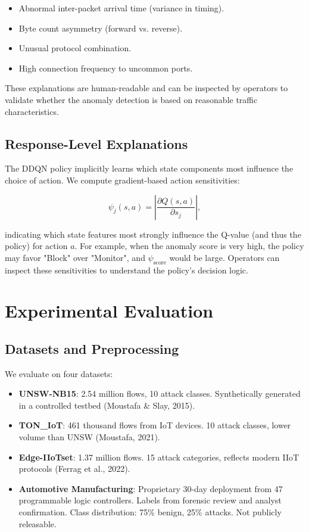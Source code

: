 \documentclass[preprint,12pt]{elsarticle}
\begin{document}
\begin{itemize}[leftmargin=1.2em]
    \item Abnormal inter-packet arrival time (variance in timing).
    \item Byte count asymmetry (forward vs. reverse).
    \item Unusual protocol combination.
    \item High connection frequency to uncommon ports.
\end{itemize}

These explanations are human-readable and can be inspected by operators to validate whether the anomaly detection is based on reasonable traffic characteristics.

\subsection{Response-Level Explanations}

The DDQN policy implicitly learns which state components most influence the choice of action. We compute gradient-based action sensitivities:

\begin{equation}
\psi_j(s, a) = \left| \frac{\partial Q(s, a)}{\partial s_j} \right|,
\label{eq:q_sensitivity}
\end{equation}

indicating which state features most strongly influence the Q-value (and thus the policy) for action $a$. For example, when the anomaly score is very high, the policy may favor "Block" over "Monitor", and $\psi_{\text{score}}$ would be large. Operators can inspect these sensitivities to understand the policy's decision logic.

\section{Experimental Evaluation}
\label{sec:experiments}

\subsection{Datasets and Preprocessing}

We evaluate on four datasets:

\begin{itemize}[leftmargin=1.2em]
    \item \textbf{UNSW-NB15}: 2.54 million flows, 10 attack classes. Synthetically generated in a controlled testbed (Moustafa \& Slay, 2015).
    \item \textbf{TON\_IoT}: 461 thousand flows from IoT devices. 10 attack classes, lower volume than UNSW (Moustafa, 2021).
    \item \textbf{Edge-IIoTset}: 1.37 million flows. 15 attack categories, reflects modern IIoT protocols (Ferrag et al., 2022).
    \item \textbf{Automotive Manufacturing}: Proprietary 30-day deployment from 47 programmable logic controllers. Labels from forensic review and analyst confirmation. Class distribution: 75\% benign, 25\% attacks. Not publicly releasable.
\end{itemize}
\end{document}
